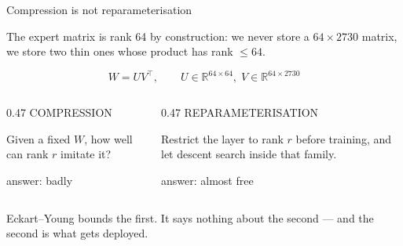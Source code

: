 \documentclass[aspectratio=169,11pt]{beamer}
\newcommand{\hl}[1]{{\color{accent}#1}}
\begin{document}
\begin{frame}{Compression is not reparameterisation}
  \vspace{2pt}
  {\small\color{bodyink}
  The expert matrix is rank 64 \hl{by construction}: we never store a
  $64\times2730$ matrix, we store two thin ones whose product has rank $\le64$.\par}

  \[
    W = U V^{\top},\qquad U\in\mathbb{R}^{64\times64},\; V\in\mathbb{R}^{64\times2730}
  \]

  \vspace{2pt}
  \begin{columns}[T]
    \begin{column}{0.47\textwidth}
      \vspace{2pt}
      {\ttfamily\scriptsize\color{stone}COMPRESSION}\\[3pt]
      {\small\color{bodyink}
      Given a fixed $W$, how well can rank $r$ imitate it?\par}
      \vspace{3pt}
      {\color{danger}\ttfamily\small answer: badly}
    \end{column}
    \begin{column}{0.47\textwidth}
      \vspace{2pt}
      {\ttfamily\scriptsize\color{stone}REPARAMETERISATION}\\[3pt]
      {\small\color{bodyink}
      Restrict the layer to rank $r$ before training, and let descent search
      inside that family.\par}
      \vspace{3pt}
      {\color{success}\ttfamily\small answer: almost free}
    \end{column}
  \end{columns}

  \vspace{10pt}
  {\color{bodyink}
  Eckart--Young bounds the first. It says \hl{nothing} about the second --- and
  the second is what gets deployed.\par}
\end{frame}
\end{document}
